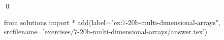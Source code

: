 
\begin{ex} 
  \label{ex:7-20b-multi-dimensional-arrays}
  
  \qed
\end{ex} 
\begin{python0}
from solutions import *
add(label="ex:7-20b-multi-dimensional-arrays",
    srcfilename='exercises/7-20b-multi-dimensional-arrays/answer.tex') 
\end{python0}
